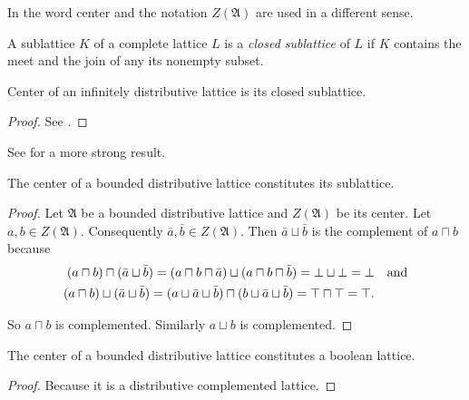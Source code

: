 \begin{rem}
In \cite{ADTCGSBVA} the word center and the notation $Z(\mathfrak{A})$
are used in a different sense.\end{rem}
\begin{defn}
A sublattice $K$ of a complete lattice
$L$ is a \emph{closed sublattice} of $L$ if $K$ contains the meet
and the join of any its nonempty subset.\end{defn}
\begin{thm}
Center of an infinitely distributive lattice is its closed sublattice.\end{thm}
\begin{proof}
See \cite{center-inf-distr}.\end{proof}
\begin{rem}
See \cite{center-complete} for a more strong result.\end{rem}
\begin{thm}
The center of a bounded distributive lattice constitutes its sublattice.\end{thm}
\begin{proof}
Let $\mathfrak{A}$ be a bounded distributive lattice and $Z(\mathfrak{A})$
be its center. Let $a,b\in Z(\mathfrak{A})$. Consequently $\bar{a},\bar{b}\in Z(\mathfrak{A})$.
Then $\bar{a}\sqcup\bar{b}$ is the complement of $a\sqcap b$ because
\begin{align*}
(a\sqcap b)\sqcap(\bar{a}\sqcup\bar{b})=(a\sqcap b\sqcap\bar{a})\sqcup(a\sqcap b\sqcap\bar{b})=\bot\sqcup\bot=\bot & \text{\quad and}\\
(a\sqcap b)\sqcup(\bar{a}\sqcup\bar{b})=(a\sqcup\bar{a}\sqcup\bar{b})\sqcap(b\sqcup{\bar{a}\sqcup\bar{b}})=\top\sqcap\top=\top.
\end{align*}


So $a\sqcap b$ is complemented. Similarly $a\sqcup b$ is complemented.\end{proof}
\begin{thm}
\label{centr-bool}The center of a bounded distributive lattice constitutes
a boolean lattice.\end{thm}
\begin{proof}
Because it is a distributive complemented lattice.
\end{proof}

